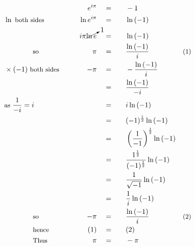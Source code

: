 \begin{alignat*}{5}
&\,&e^{i\pi}\quad&=\quad&&-1\\
&\small\ln{}\text{ both sides}&\ln{e^{i\pi}}\quad&=&&\ln{(-1)}\\
&\,&i\pi\cancelto{1}{\ln{e}}\quad&=&&\ln{(-1)}\\
&\qquad\qquad\small\text{so}&\pi\quad&=&&\frac{\ln{(-1)}}{i}\qquad&\small\text{(1)}\\
&\small\times(-1)\text{ both sides}\qquad&-\pi\quad&=&&-\frac{\ln{(-1)}}{i}\\
&\,&\,&=&&\frac{\ln{(-1)}}{-i}\\
&\small\text{as }\frac{1}{-i}=i&\,&=&&i\ln{(-1)}\\
&\,&\,&=&&(-1)^{\frac{1}{2}}\ln{(-1)}\\
&\,&\,&=&&\left(\frac{1}{-1}\right)^\frac{1}{2}\ln{(-1)}\\
&\,&\,&=&&\frac{1^\frac{1}{2}}{(-1)^\frac{1}{2}}\ln{(-1)}\\
&\,&\,&=&&\frac{1}{\sqrt{-1}}\ln{(-1)}\\
&\,&\,&=&&\frac{1}{i}\ln{(-1)}\\
&\qquad\qquad\small\text{so}&-\pi\quad&=&&\frac{\ln{(-1)}}{i}\qquad&\small\text{(2)}\\
&\qquad\qquad\small\text{hence}&(1)\quad&=&&(2)\\
&\qquad\qquad\small\text{Thus}&\pi\quad&=&&-\pi
\end{alignat*}
